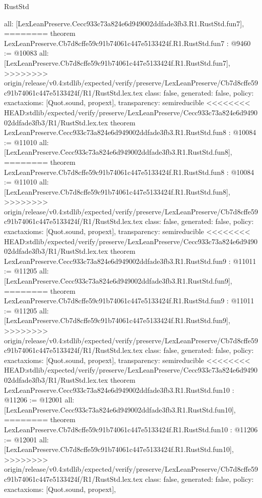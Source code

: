 \begin{lexlean}{RustStd}
\begin{coremodule}
{\begin{coremodule}
{{{{{{{{{{  all: [LexLeanPreserve.Cecc933c73a824e6d949002ddfade3fb3.R1.RustStd.fun7],
========
theorem LexLeanPreserve.Cb7d8cffe59c91b74061c447e5133424f.R1.RustStd.fun7 : @9460 := @10083 {
  all: [LexLeanPreserve.Cb7d8cffe59c91b74061c447e5133424f.R1.RustStd.fun7],
>>>>>>>> origin/release/v0.4:stdlib/expected/verify/preserve/LexLeanPreserve/Cb7d8cffe59c91b74061c447e5133424f/R1/RustStd.lex.tex
  class: false,
  generated: false,
  policy: exact{axioms: [Quot.sound, propext]},
  transparency: semireducible
}
<<<<<<<< HEAD:stdlib/expected/verify/preserve/LexLeanPreserve/Cecc933c73a824e6d949002ddfade3fb3/R1/RustStd.lex.tex
theorem LexLeanPreserve.Cecc933c73a824e6d949002ddfade3fb3.R1.RustStd.fun8 : @10084 := @11010 {
  all: [LexLeanPreserve.Cecc933c73a824e6d949002ddfade3fb3.R1.RustStd.fun8],
========
theorem LexLeanPreserve.Cb7d8cffe59c91b74061c447e5133424f.R1.RustStd.fun8 : @10084 := @11010 {
  all: [LexLeanPreserve.Cb7d8cffe59c91b74061c447e5133424f.R1.RustStd.fun8],
>>>>>>>> origin/release/v0.4:stdlib/expected/verify/preserve/LexLeanPreserve/Cb7d8cffe59c91b74061c447e5133424f/R1/RustStd.lex.tex
  class: false,
  generated: false,
  policy: exact{axioms: [Quot.sound, propext]},
  transparency: semireducible
}
<<<<<<<< HEAD:stdlib/expected/verify/preserve/LexLeanPreserve/Cecc933c73a824e6d949002ddfade3fb3/R1/RustStd.lex.tex
theorem LexLeanPreserve.Cecc933c73a824e6d949002ddfade3fb3.R1.RustStd.fun9 : @11011 := @11205 {
  all: [LexLeanPreserve.Cecc933c73a824e6d949002ddfade3fb3.R1.RustStd.fun9],
========
theorem LexLeanPreserve.Cb7d8cffe59c91b74061c447e5133424f.R1.RustStd.fun9 : @11011 := @11205 {
  all: [LexLeanPreserve.Cb7d8cffe59c91b74061c447e5133424f.R1.RustStd.fun9],
>>>>>>>> origin/release/v0.4:stdlib/expected/verify/preserve/LexLeanPreserve/Cb7d8cffe59c91b74061c447e5133424f/R1/RustStd.lex.tex
  class: false,
  generated: false,
  policy: exact{axioms: [Quot.sound, propext]},
  transparency: semireducible
}
<<<<<<<< HEAD:stdlib/expected/verify/preserve/LexLeanPreserve/Cecc933c73a824e6d949002ddfade3fb3/R1/RustStd.lex.tex
theorem LexLeanPreserve.Cecc933c73a824e6d949002ddfade3fb3.R1.RustStd.fun10 : @11206 := @12001 {
  all: [LexLeanPreserve.Cecc933c73a824e6d949002ddfade3fb3.R1.RustStd.fun10],
========
theorem LexLeanPreserve.Cb7d8cffe59c91b74061c447e5133424f.R1.RustStd.fun10 : @11206 := @12001 {
  all: [LexLeanPreserve.Cb7d8cffe59c91b74061c447e5133424f.R1.RustStd.fun10],
>>>>>>>> origin/release/v0.4:stdlib/expected/verify/preserve/LexLeanPreserve/Cb7d8cffe59c91b74061c447e5133424f/R1/RustStd.lex.tex
  class: false,
  generated: false,
  policy: exact{axioms: [Quot.sound, propext]},
}}}}}}}}}}}}}}
\end{coremodule}}
\end{coremodule}
\end{lexlean}
